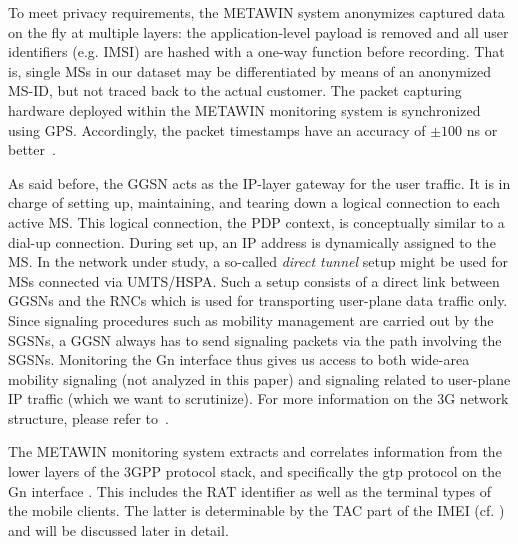 To meet privacy requirements, the \gls{METAWIN} system anonymizes captured data on the fly at multiple layers: the application-level payload is removed and all user identifiers (e.g. \gls{IMSI}) are hashed with a one-way function before recording. That is, single \glspl{MS} in our dataset may be differentiated by means of an anonymized \gls{MS-ID}, but not traced back to the actual customer. The packet capturing hardware deployed within the \gls{METAWIN} monitoring system is synchronized using \gls{GPS}. Accordingly, the packet timestamps have an accuracy of $\pm100$ ns or better~\cite[p.97-98]{donnelly_high_2002}.




As said before, the \gls{GGSN} acts as the IP-layer gateway for the user traffic. It is in charge of setting up,
maintaining, and tearing down a logical connection to each active \gls{MS}. This logical connection, the \gls{PDP} context,
is conceptually similar to a dial-up connection. During set up, an
IP address is dynamically assigned to the \gls{MS}.
In the network under study, a so-called \textit{direct tunnel} setup might be used for \glspl{MS} connected
via \gls{UMTS}/\gls{HSPA}. Such a setup consists of a direct link between \glspl{GGSN} and the
\glspl{RNC} %
which is used for
transporting user-plane data traffic only. Since signaling procedures such
as mobility management are carried out by the \glspl{SGSN}, a \gls{GGSN} always has to send signaling packets
via the path involving the \glspl{SGSN}. Monitoring the Gn interface thus gives us access to both wide-area mobility signaling (not analyzed in this paper) %
and signaling related to user-plane IP traffic (which we want to scrutinize).
For more information on the \gls{3G} network structure, please refer to~\cite{bannister_convergence_2004}.

The METAWIN monitoring system extracts and correlates information from the lower
layers of the \gls{3GPP} protocol stack, and specifically the \gls{gtp} protocol
on the Gn interface \cite{3gpp.29.060}. This includes the \acrfull{RAT} identifier as well as the terminal types of the mobile clients. The
latter is determinable by the \acrfull{TAC} part of the \acrfull{IMEI} (cf. \cite{3gpp.23.003}) and will be discussed later in detail.

